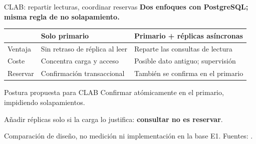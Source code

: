 \renewcommand{\fuentespie}{Fuentes: \cite{gsPg18Replication,gsPg18Ranges}}
\begin{frame}{CLAB: repartir lecturas, coordinar reservas}
  \small
  \textbf{Dos enfoques con PostgreSQL; misma regla de no solapamiento.}
  \medskip
  \begin{tabular}{@{}p{}p{}p{}@{}}
    \toprule
    & \textbf{Solo primario} & \textbf{Primario + réplicas asíncronas} \\
    \midrule
    Ventaja & Sin retraso de réplica al leer & Reparte las consultas de lectura \\
    Coste & Concentra carga y acceso & Posible dato antiguo; supervisión \\
    Reservar & Confirmación transaccional & También se confirma en el primario \\
    \bottomrule
  \end{tabular}
  \medskip
  \begin{block}{Postura propuesta para CLAB}
    Confirmar atómicamente en el primario, impidiendo solapamientos.\par
    Añadir réplicas solo si la carga lo justifica: \textbf{consultar no es reservar}.
  \end{block}
  {\scriptsize Comparación de diseño, no medición ni implementación en la base
  E1. Fuentes: \cite{gsPg18Replication,gsPg18Ranges}.}
\end{frame}
\renewcommand{\fuentespie}{Fuentes: [PENDIENTE]}
